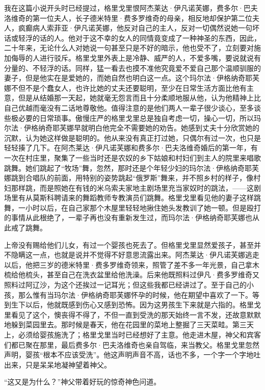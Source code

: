 \par 我在这篇小说开头时已经提过，格里戈里恨阿杰莱达·伊凡诺芙娜，费多尔·巴夫洛维奇的第一位夫人，长子德米特里·费多罗维奇的母亲，相反地却保护第二位夫人，疯癫病人索菲亚·伊凡诺芙娜，他反对自己的主人，反对一切偶然说她一句坏话或轻浮的话的人。他对于这不幸的女人的同情竟变成了一种神圣的东西，因此，二十年来，无论什么人对她说一句甚至只是不好的暗示，他也受不了，立刻要对施加侮辱的人进行驳斥。格里戈里外表上是冷静、威严的人，不爱多嘴，要说就说有分量的、不轻浮的话。同样，猛一看去也摸不准他究竟爱不爱自己那个温顺驯服的妻子，但是他实在是爱她的，而她自然也明白这一点。这个玛尔法·伊格纳奇耶芙娜不但不是个蠢女人，也许比她的丈夫还要聪明，至少在日常生活方面比他有主意，但是从结婚那一天起，她就毫无怨言而且十分柔顺地服从他，认为他精神上比自己优越而毫没有二话地尊敬他。值得注意的是他们两人一辈子很少谈心，至多谈些极必要的日常琐事。傲慢庄严的格里戈里总是独自考虑一切，操心一切，所以玛尔法·伊格纳奇耶芙娜早就明白他完全不需要她的劝告。她感到丈夫十分欣赏她的沉默，认为她这样做是聪明的。他从来没有真正打过她，只偶尔有过一次，也只是轻轻揍了几下。在阿杰莱达·伊凡诺芙娜和费多尔·巴夫洛维奇婚后的第一年，有一次在村庄里，聚集了一些当时还是农奴的乡下姑娘和村妇们到主人的院里来唱歌跳舞。她们跳起了“牧场”舞，忽然，那时还是个年轻少妇的玛尔法·伊格纳奇耶芙娜跳到合唱队的前面，用特别的姿势跳起“俄罗斯”舞来，并不照乡村的样子，像村妇那样跳，而是照她在有钱的米乌索夫家地主剧场里充当家奴时的跳法，——这剧场里有从莫斯科聘请来的舞蹈教师专教演员们跳舞。格里戈里看见他的妻子这样跳舞，一小时以后，在自己家那个木屋里轻轻地揪住她头发教训了她一顿。但是殴打的事情从此根绝了，一辈子再也没有重新发生过，而玛尔法·伊格纳奇耶芙娜也从此戒了跳舞。
\par 上帝没有赐给他们儿女，有过一个婴孩也死去了。但格里戈里显然爱孩子，甚至并不隐瞒这一点，也就是说并不觉得不好意思流露出来。阿杰莱达·伊凡诺芙娜逃走以后，他把三岁的德米特里·费多罗维奇领来，照管了差不多一年光景，自己拿木梳给他梳头，甚至自己在洗衣盆里给他洗澡。后来他既照料过伊凡·费多罗维奇又照料过阿辽沙，为这个还挨过一记耳光；但这些我都已经讲过了。至于自己的小孩，那么惟有当玛尔法·伊格纳奇耶芙娜怀孕的时候，他在期望中喜欢了一下。等到生下以后，他就既感到伤心又感到恐怖。因为这男孩生下来就是六指的。格里戈里看见了这个，懊丧得不得了，不但一直到受洗的那天始终一言不发，还故意默默地躲到菜园里去。那时候是春天，他在花园里的菜地上整掘了三天菜畦。第三天上，必须给婴孩施洗了；格里戈里当时已经想好了主意。他走进木屋，神父和宾客们都已聚在那里，最后费多尔·巴夫洛维奇也亲自驾临，来当教父。格里戈里忽然声明，婴孩“根本不应该受洗”。他这声明声音不高，话也不多，一个字一个字地吐出来，只是呆呆地凝神望着神父。
\par “这又是为什么？”神父带着好玩的惊奇神色问道。
